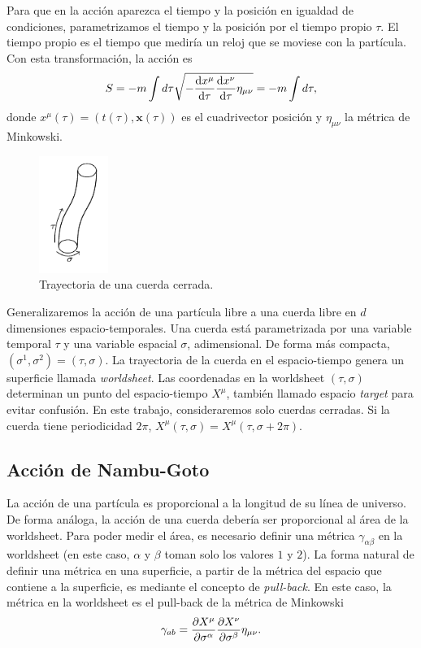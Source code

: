 Para que en la acción aparezca el tiempo y la posición en igualdad de condiciones,
parametrizamos el tiempo y la posición por el tiempo propio $\tau$. 
El tiempo propio es el tiempo que mediría un reloj que se moviese con la partícula.
Con esta transformación, la acción es
\begin{equation}
 S = -m\int d\tau \sqrt{-\dv{x^\mu}{\tau}\dv{x^\nu}{\tau}\eta_{\mu\nu}}=-m\int d\tau,
\end{equation}
donde $x^\mu(\tau)=(t(\tau),\mathbf x(\tau))$ es el cuadrivector posición y $\eta_{\mu\nu}$ la
métrica de Minkowski.

\begin{figure}
\includegraphics[width=0.2\textwidth]{string.pdf}
 \caption{Trayectoria de una cuerda cerrada.}                   
\end{figure}
Generalizaremos la acción de una partícula libre a una cuerda libre en $d$ dimensiones espacio-temporales.
Una cuerda está parametrizada por una variable temporal $\tau$ y una variable espacial $\sigma$, adimensional.
De forma más compacta, $(\sigma^1,\sigma^2)=(\tau,\sigma)$. 
La trayectoria de la cuerda en el espacio-tiempo genera un superficie llamada \emph{worldsheet}.
Las coordenadas en la worldsheet $(\tau,\sigma)$ determinan un punto del espacio-tiempo $X^\mu$, también llamado
espacio \emph{target} para evitar confusión.
En este trabajo, consideraremos solo cuerdas cerradas. 
Si la cuerda tiene periodicidad $2\pi$, $X^\mu(\tau,\sigma)=X^\mu(\tau,\sigma+2\pi)$.

\subsection{Acción de Nambu-Goto}

La acción de una partícula es proporcional a la longitud de su línea de universo.
De forma análoga, la acción de una cuerda debería ser proporcional al área de la
worldsheet.
Para poder medir el área, es necesario definir una métrica $\gamma_{\alpha\beta}$ en la worldsheet (en este caso, $\alpha$ y $\beta$ 
toman solo los valores $1$ y $2$).
La forma natural de definir una métrica en una superficie, a partir de la métrica del espacio que
contiene a la superficie, es mediante el concepto de \emph{pull-back}.
En este caso, la métrica en la worldsheet es el pull-back de la métrica de Minkowski
\begin{equation}
  \gamma_{ab}=\pdv{X^\mu}{\sigma^\alpha}\pdv{X^\nu}{\sigma^\beta}\eta_{\mu\nu}.
\end{equation}

